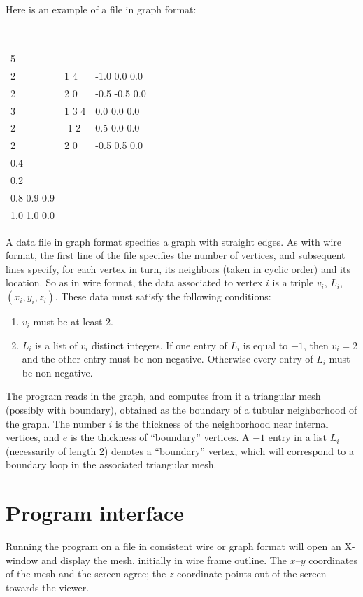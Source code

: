 \documentclass[12pt]{article}
\begin{document}
Here is an example of a file in graph format:

\begin{center}
{\tt
\begin{tabular}{lll}
5 & & \\
2 & 1 4 & -1.0 0.0 0.0 \\
2 & 2 0 & -0.5 -0.5 0.0 \\
3 & 1 3 4 & 0.0 0.0 0.0 \\
2 & -1 2 & 0.5 0.0 0.0 \\
2 & 2 0 & -0.5 0.5 0.0 \\
0.4 & & \\
0.2 & & \\
0.8 0.9 0.9 & & \\
1.0 1.0 0.0 & &
\end{tabular}
}
\end{center}

A data file in graph format specifies a graph with straight edges. As with wire format,
the first line of the file specifies the number of vertices, and subsequent lines specify,
for each vertex in turn, its neighbors (taken in cyclic order) and its location. 
So as in wire format, the data associated to vertex $i$ is a triple $v_i$, $L_i$, $(x_i,y_i,z_i)$.
These data must satisfy the following conditions:
\begin{enumerate}
\item{$v_i$ must be at least $2$.}
\item{$L_i$ is a list of $v_i$ distinct integers. If one entry of $L_i$ is equal to $-1$, then
$v_i=2$ and the other entry must be non-negative. Otherwise every entry of $L_i$ must be
non-negative.}
\end{enumerate}

The program reads in the graph, and computes from it a triangular mesh (possibly with
boundary), obtained as the boundary of a tubular neighborhood of the graph. The
number $i$ is the thickness of the neighborhood near internal vertices, and $e$ is
the thickness of ``boundary'' vertices. A $-1$
entry in a list $L_i$ (necessarily of length 2) denotes a ``boundary'' vertex, which
will correspond to a boundary loop in the associated triangular mesh.

\section{Program interface}\label{section:interface}

Running the program on a file in consistent wire or graph format will open an X-window
and display the mesh, initially in wire frame outline. The $x$--$y$ coordinates of the
mesh and the screen agree; the $z$ coordinate points out of the screen towards the viewer.
\end{document}
